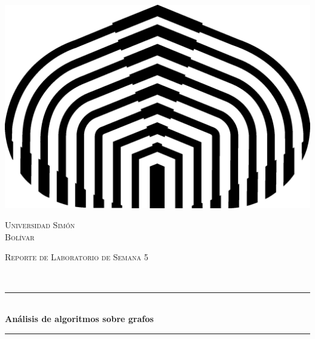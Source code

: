 \documentclass[11pt]{article}
\begin{document}

\begin{center} 
   \newcommand{\HRule}{\rule{\linewidth}{0.5mm}}  

   \begin{minipage}{0.48\textwidth}
      \begin{center}
         \includegraphics[scale = 0.5]{logo.png}
      \end{center}
   \end{minipage}

   \vspace*{1.0cm}                       
   \textsc{\huge Universidad Simón \\ \vspace{5px} Bolívar} \\ [1.5cm] 

   \begin{minipage}{0.9\textwidth} 
      \begin{center}                                                             
         \textsc{\LARGE Reporte de Laboratorio de Semana 5 }
      \end{center}
   \end{minipage} \\ [3cm]

   \vspace*{1cm}                                                                              
   \HRule \\ [0.4cm]                                                  
   {\huge \bfseries Análisis de algoritmos sobre grafos} \\ [0.4cm] 
   \HRule \\ [4cm]


\end{center}
\end{document}

